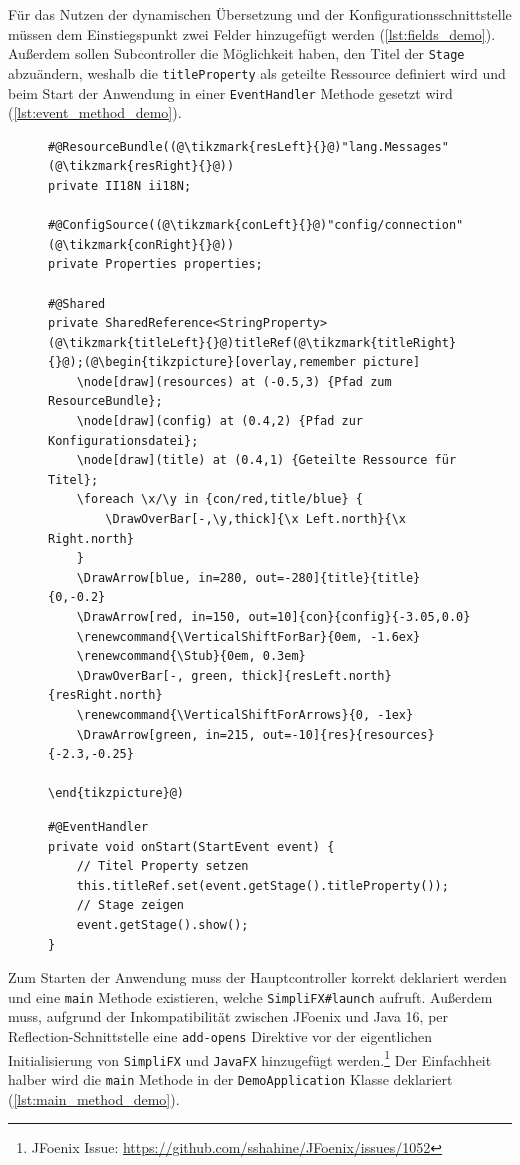 \noindent Für das Nutzen der dynamischen Übersetzung und der Konfigurationsschnittstelle müssen dem Einstiegspunkt zwei Felder hinzugefügt werden (\autoref{lst:fields_demo}). Außerdem sollen Subcontroller die Möglichkeit haben, den Titel der \texttt{Stage} abzuändern, weshalb die \texttt{titleProperty} als geteilte Ressource definiert wird und beim Start der Anwendung in einer \texttt{EventHandler} Methode gesetzt wird (\autoref{lst:event_method_demo}).
\begin{figure}[H]
	\begin{lstlisting}[caption=Demo -- Benötigte Felder., captionpos=b, label=lst:fields_demo]
#@ResourceBundle((@\tikzmark{resLeft}{}@)"lang.Messages"(@\tikzmark{resRight}{}@))
private II18N ii18N;

#@ConfigSource((@\tikzmark{conLeft}{}@)"config/connection"(@\tikzmark{conRight}{}@))
private Properties properties;

#@Shared
private SharedReference<StringProperty> (@\tikzmark{titleLeft}{}@)titleRef(@\tikzmark{titleRight}{}@);(@\begin{tikzpicture}[overlay,remember picture]
	\node[draw](resources) at (-0.5,3) {Pfad zum ResourceBundle};
	\node[draw](config) at (0.4,2) {Pfad zur Konfigurationsdatei};
	\node[draw](title) at (0.4,1) {Geteilte Ressource für Titel};
	\foreach \x/\y in {con/red,title/blue} {
		\DrawOverBar[-,\y,thick]{\x Left.north}{\x Right.north}
	}
	\DrawArrow[blue, in=280, out=-280]{title}{title}{0,-0.2}
	\DrawArrow[red, in=150, out=10]{con}{config}{-3.05,0.0}
	\renewcommand{\VerticalShiftForBar}{0em, -1.6ex}
	\renewcommand{\Stub}{0em, 0.3em}
	\DrawOverBar[-, green, thick]{resLeft.north}{resRight.north}
	\renewcommand{\VerticalShiftForArrows}{0, -1ex}
	\DrawArrow[green, in=215, out=-10]{res}{resources}{-2.3,-0.25}

\end{tikzpicture}@)
	\end{lstlisting}
\end{figure}
\begin{figure}[H]
	\begin{lstlisting}[caption=Demo -- Start EventHandler., captionpos=b, label=lst:event_method_demo]
#@EventHandler
private void onStart(StartEvent event) {
	// Titel Property setzen
    this.titleRef.set(event.getStage().titleProperty());
	// Stage zeigen
    event.getStage().show();
}
	\end{lstlisting}
\end{figure}
\noindent Zum Starten der Anwendung muss der Hauptcontroller korrekt deklariert werden und eine \texttt{main} Methode existieren, welche \texttt{SimpliFX\#launch} aufruft. Außerdem muss, aufgrund der Inkompatibilität zwischen JFoenix und Java 16, per Reflection-Schnittstelle eine \texttt{add-opens} Direktive vor der eigentlichen Initialisierung von \texttt{SimpliFX} und \texttt{JavaFX} hinzugefügt werden.\footnote{JFoenix Issue: \url{https://github.com/sshahine/JFoenix/issues/1052}} Der Einfachheit halber wird die \texttt{main} Methode in der \texttt{DemoApplication} Klasse deklariert (\autoref{lst:main_method_demo}).
